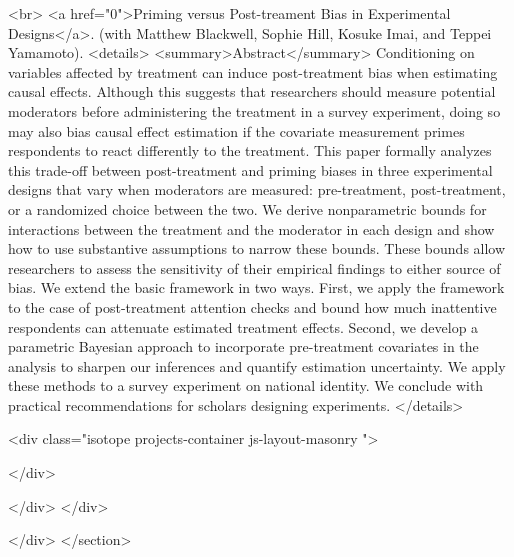 <br> <a href="0">Priming versus Post-treament Bias in Experimental Designs</a>. (with Matthew Blackwell, Sophie Hill, Kosuke Imai, and Teppei Yamamoto). 
<details>
  <summary>Abstract</summary>
  Conditioning on variables affected by treatment can induce post-treatment bias when estimating causal effects. Although this suggests that researchers should measure potential moderators before administering the treatment in a survey experiment, doing so may also bias causal effect estimation if the covariate measurement primes respondents to react differently to the treatment. This paper formally analyzes this trade-off between post-treatment and priming biases in three experimental designs that vary when moderators are measured: pre-treatment, post-treatment, or a randomized choice between the two. We derive nonparametric bounds for interactions between the treatment and the moderator in each design and show how to use substantive assumptions to narrow these bounds. These bounds allow researchers to assess the sensitivity of their empirical findings to either source of bias.  We extend the basic framework in two ways. First, we apply the framework to the case of post-treatment attention checks and bound how much inattentive respondents can attenuate estimated treatment effects. Second, we develop a parametric Bayesian approach to incorporate pre-treatment covariates in the analysis to sharpen our inferences and quantify estimation uncertainty. We apply these methods to a survey experiment on national identity. We conclude with practical recommendations for scholars designing experiments.
</details>






    <div class="isotope projects-container js-layout-masonry ">

    </div>

  </div>
</div>

    </div>
  </section>































